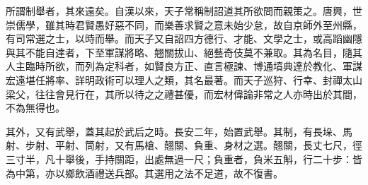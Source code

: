 \begin{pinyinscope}
 所謂制舉者，其來遠矣。自漢以來，天子常稱制詔道其所欲問而親策之。唐興，世崇儒學，雖其時君賢愚好惡不同，而樂善求賢之意未始少怠，故自京師外至州縣，有司常選之士，以時而舉。而天子又自詔四方德行、才能、文學之士，或高蹈幽隱與其不能自達者，下至軍謀將略、翹關拔山、絕藝奇伎莫不兼取。其為名目，隨其人主臨時所欲，而列為定科者，如賢良方正、直言極諫、博通墳典達於教化、軍謀宏遠堪任將率、詳明政術可以理人之類，其名最著。而天子巡狩、行幸、封禪太山梁父，往往會見行在，其所以待之之禮甚優，而宏材偉論非常之人亦時出於其間，不為無得也。



 其外，又有武舉，蓋其起於武后之時。長安二年，始置武舉。其制，有長垛、馬射、步射、平射、筒射，又有馬槍、翹關、負重、身材之選。翹關，長丈七尺，徑三寸半，凡十舉後，手持關距，出處無過一尺；負重者，負米五斛，行二十步：皆為中第，亦以鄉飲酒禮送兵部。其選用之法不足道，故不復書。



\end{pinyinscope}